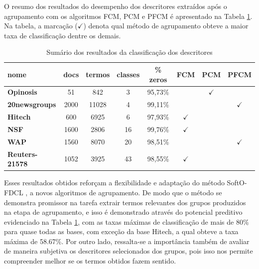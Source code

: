 O resumo dos resultados do desempenho dos descritores extraídos após o agrupamento com os
algoritmos FCM, PCM e PFCM é apresentado na Tabela \ref{table:pfcmsummary}. Na tabela, a marcação
($\checkmark$) denota qual método de agrupamento obteve a maior taxa de classificação dentre os
demais.

\begin{table}[!htp]
  \centering
  \begin{tabular}{ |l|c c c c c c c|}
    \hline
    {\bf nome} & docs & termos & classes & \% zeros & FCM & PCM & PFCM \\
    \hline
    {\bf Opinosis} & 51 & 842 & 3 & 95,73\% & & $\checkmark$ &  \\
    \hline
    {\bf 20newsgroups} & 2000 & 11028 & 4 & 99,11\% & & & $\checkmark$\\
    \hline
    {\bf Hitech} & 600 & 6925 & 6 & 97,93\% & $\checkmark$ & & \\
    \hline
    {\bf NSF} & 1600 & 2806 & 16 & 99,76\% & $\checkmark$ & & \\
    \hline
    {\bf WAP} & 1560 & 8070 & 20 & 98,51\% & & & $\checkmark$ \\
    \hline
    {\bf Reuters-21578} & 1052 & 3925 & 43 & 98,55\% & $\checkmark$ & & \\
    \hline
  \end{tabular}
  \caption{Sumário dos resultados da classificação dos descritores}
  \label{table:pfcmsummary}
\end{table}

Esses resultados obtidos reforçam a flexibilidade e adaptação do método SoftO-FDCL
\cite{Nogueira2013}, a novos algoritmos de agrupamento. De modo que o método se demonstra promissor
na tarefa extrair termos relevantes dos grupos produzidos na etapa de agrupamento, e isso é
demonstrado através do potencial preditivo evidenciado na Tabela \ref{table:pfcmsummary}, com as
taxas máximas de classificação de mais de 80\% para quase todas as bases, com exceção da base
Hitech, a qual obteve a taxa máxima de 58.67\%.  Por outro lado, ressalta-se a importância também de
avaliar de maneira subjetiva os descritores selecionados dos grupos, pois isso nos permite
compreender melhor se os termos obtidos fazem sentido. 

